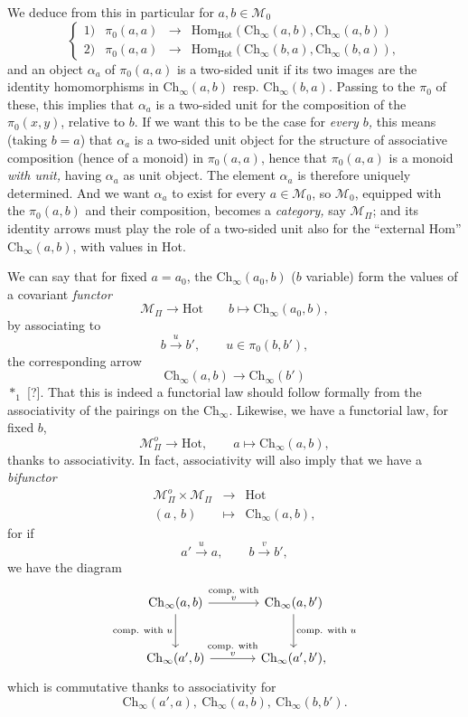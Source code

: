 \documentclass[11pt]{article}
\newcommand{\printedpage}[1]{\marginpar{\footnotesize p.~#1}}
\newcommand{\msp}[1]{\marginpar{\footnotesize [#1]}}
\newcommand{\Ch}{\mathrm{Ch}}
\newcommand{\Hot}{\mathrm{Hot}}
\newcommand{\Hom}{\mathrm{Hom}}
\begin{document}
We deduce from this in particular for $a,b \in \mathcal{M}_0$
\[
\left\{
\begin{array}{cccc}
1) & \pi_0(a,a) & \longrightarrow & \Hom_{\Hot}(\Ch_\infty(a,b),\Ch_\infty(a,b)) \\[1ex]
2) & \pi_0(a,a) & \longrightarrow & \Hom_{\Hot}(\Ch_\infty(b,a),\Ch_\infty(b,a)),
\end{array}
\right.
\tag*{$(*)$}
\]
and an object $\alpha_a$ of $\pi_0(a,a)$ is a two-sided unit if its two images are the identity homomorphisms in $\Ch_\infty(a,b)$ resp. $\Ch_\infty(b,a)$. Passing to the $\pi_0$ of these, this implies that $\alpha_a$ is a two-sided unit for the composition of the $\pi_0(x,y)$, relative to $b$. If we want this to be the case for \textit{every $b$,} this means (taking $b = a$) that $\alpha_a$ is a two-sided unit object for the structure of associative composition (hence of a monoid) in $\pi_0(a,a)$, hence that $\pi_0(a,a)$ is a monoid \textit{with unit,} having $\alpha_a$ as unit object. The element $\alpha_a$ is therefore uniquely determined. And we want $\alpha_a$ to exist
\msp{page 3}
for every $a \in \mathcal{M}_0$, so $\mathcal{M}_0$, equipped with the $\pi_0(a,b)$ and their composition, becomes a \textit{category,} say $\mathcal{M}_\Pi$; and its identity arrows must play the role of a two-sided unit also for the ``external Hom'' $\Ch_\infty(a,b)$, with values in Hot.

We can say that for fixed $a = a_0$, the $\Ch_\infty(a_0,b)$ ($b$ variable) form the values of a covariant \textit{functor}
\[
\mathcal{M}_\Pi \longrightarrow \Hot \qquad b \longmapsto \Ch_\infty(a_0,b),
\]
by associating to
\[
b \xrightarrow{\ u\ } b', \qquad u \in \pi_0(b,b'),
\]
the corresponding arrow
\[
\Ch_\infty(a,b) \longrightarrow \Ch_\infty(b') %
\]
 $*_1$ [?]. That this is indeed a functorial law should follow formally from the associativity of the pairings on the $\Ch_\infty$. Likewise, we have a functorial law, for fixed $b$,
\[
\mathcal{M}^o_\Pi \longrightarrow \Hot, \qquad a \longmapsto \Ch_\infty(a,b),
\]
thanks to associativity. In fact, associativity will also imply that we have a \textit{bifunctor}
\[
\begin{array}{ccc}
\mathcal{M}^o_\Pi \times \mathcal{M}_\Pi & \longrightarrow & \Hot \\[1ex]
(a\,,\,b) & \longmapsto & \Ch_\infty(a,b),
\end{array}
\]
\printedpage{3}
\msp{page 4}
for if
\[
a' \xrightarrow{\ u\ } a, \qquad b \xrightarrow{\ v\ } b',
\]
we have the diagram
\[
\begin{tikzcd}[column sep=large, row sep=large]
\Ch_\infty(a,b) \arrow[r, "\substack{\text{comp. with}\\ v}"] \arrow[d, "\text{comp. with } u"'] & \Ch_\infty(a,b') \arrow[d, "\text{comp. with } u"] \\
\Ch_\infty(a',b) \arrow[r, "\substack{\text{comp. with}\\ v}"] & \Ch_\infty(a',b'),
\end{tikzcd}
\]
which is commutative thanks to associativity for
\[
\Ch_\infty(a',a),\ \Ch_\infty(a,b),\ \Ch_\infty(b,b').
\]
\end{document}
